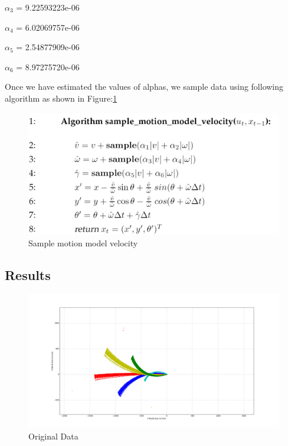 \documentclass[10pt]{scrartcl}
\begin{document}
$\alpha_3$ =  9.22593223e-06

$\alpha_4$ =  6.02069757e-06

$\alpha_5$ =  2.54877909e-06

$\alpha_6$ =  8.97275720e-06
     

Once we have estimated the values of alphas, we sample data using following algorithm as shown in Figure:\ref{fig:samplingmodel}

\begin{figure}[ht!]
\centering
\includegraphics[scale=0.2]{images/sampling-model}
\caption{Sample motion model velocity \cite{MotionModel}}
\label{fig:samplingmodel}
\end{figure}

\subsection{Results}

\begin{figure}[H]
\centering
\includegraphics[scale=0.25]{images/figure_1}
\caption{Original Data}
\label{fig:OriginalData}
\end{figure}
\end{document}
